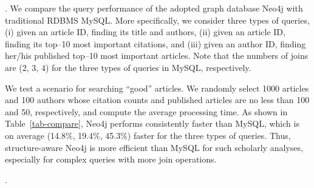 



.
We compare the query performance of the adopted graph database Neo4j with traditional RDBMS MySQL. More specifically, we consider three types of queries, \ie (i) given an article ID, finding its title and authors, (ii)  given an article ID, finding its top--10 most important citations, and (iii) given an author ID, finding her/his published top--10 most important articles. Note that the numbers of joins are (2, 3, 4) for the three types of queries in MySQL, respectively.

We test a scenario for searching ``good'' articles. We randomly select 1000 articles and 100 authors whose citation counts and published articles are no less than 100 and 50, respectively, and compute the average processing time. As shown in Table~\ref{tab-compare}, Neo4j performs consistently faster than MySQL, which is on average (14.8\%, 19.4\%, 45.3\%) faster for the three types of queries.
Thus, structure-aware Neo4j is more efficient than MySQL for such scholarly analyses, especially for complex queries with more join operations.


.




